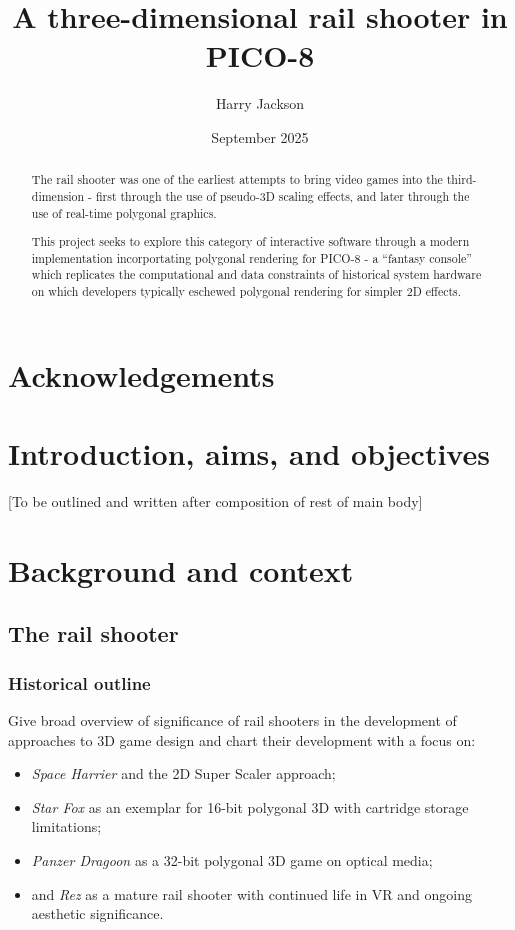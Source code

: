 \documentclass{article}
\title{A three-dimensional rail shooter in PICO-8}
\author{Harry Jackson}
\date{September 2025}
\begin{document}
\maketitle

\begin{abstract}
The rail shooter was one of the earliest attempts to bring video
games into the third-dimension - first through the use of pseudo-3D
scaling effects, and later through the use of real-time polygonal graphics.

This project seeks to explore this category of interactive software through a
modern implementation incorportating polygonal rendering for PICO-8 - a
``fantasy console'' which replicates the computational and data constraints of
historical system hardware on which developers typically eschewed polygonal
rendering for simpler 2D effects.
\end{abstract}

\section*{Acknowledgements}

\tableofcontents

\section{Introduction, aims, and objectives}
[To be outlined and written after composition of rest of main body]


\section{Background and context}

\subsection{The rail shooter}
\subsubsection*{Historical outline}
Give broad overview of significance of rail shooters in the development of approaches
to 3D game design and chart their development with a focus on:
\begin{itemize}
   \item\textit{Space Harrier} and the 2D Super Scaler approach;
   \item\textit{Star Fox} as an exemplar for 16-bit polygonal 3D with
   cartridge storage limitations;
   \item\textit{Panzer Dragoon} as a 32-bit polygonal 3D game on optical media;
   \item and \textit{Rez} as a mature rail shooter with continued life in VR and
   ongoing aesthetic significance.
\end{itemize}
\end{document}

